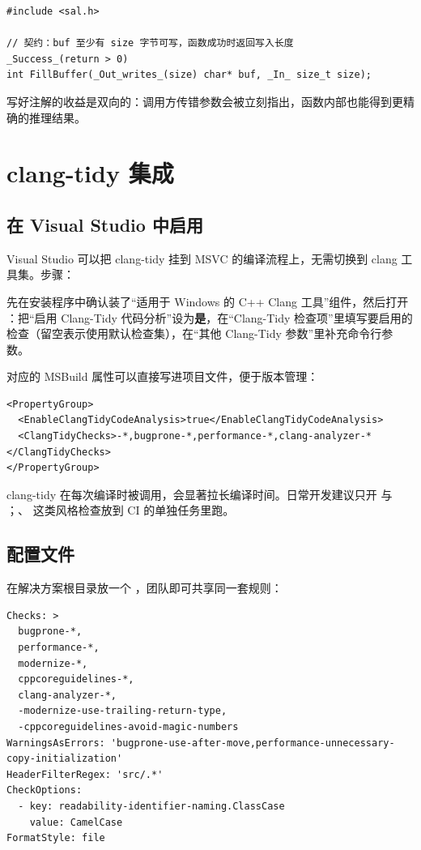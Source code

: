 \begin{lstlisting}[style=cppstyle]
#include <sal.h>

// 契约：buf 至少有 size 字节可写，函数成功时返回写入长度
_Success_(return > 0)
int FillBuffer(_Out_writes_(size) char* buf, _In_ size_t size);
\end{lstlisting}

写好注解的收益是双向的：调用方传错参数会被立刻指出，函数内部也能得到更精确的推理结果。

\section{clang-tidy 集成}
\subsection{在 Visual Studio 中启用}
Visual Studio 可以把 clang-tidy 挂到 MSVC 的编译流程上，无需切换到 clang 工具集。步骤：

先在安装程序中确认装了“适用于 Windows 的 C++ Clang 工具”组件，然后打开 ：把“启用 Clang-Tidy 代码分析”设为\textbf{是}，在“Clang-Tidy 检查项”里填写要启用的检查（留空表示使用默认检查集），在“其他 Clang-Tidy 参数”里补充命令行参数。

对应的 MSBuild 属性可以直接写进项目文件，便于版本管理：

\begin{lstlisting}[style=xmlstyle]
<PropertyGroup>
  <EnableClangTidyCodeAnalysis>true</EnableClangTidyCodeAnalysis>
  <ClangTidyChecks>-*,bugprone-*,performance-*,clang-analyzer-*</ClangTidyChecks>
</PropertyGroup>
\end{lstlisting}

\begin{warnbox}[注意]
clang-tidy 在每次编译时被调用，会显著拉长编译时间。日常开发建议只开  与 ；、 这类风格检查放到 CI 的单独任务里跑。
\end{warnbox}

\subsection{ 配置文件}
在解决方案根目录放一个 ，团队即可共享同一套规则：

\begin{lstlisting}[style=textstyle]
Checks: >
  bugprone-*,
  performance-*,
  modernize-*,
  cppcoreguidelines-*,
  clang-analyzer-*,
  -modernize-use-trailing-return-type,
  -cppcoreguidelines-avoid-magic-numbers
WarningsAsErrors: 'bugprone-use-after-move,performance-unnecessary-copy-initialization'
HeaderFilterRegex: 'src/.*'
CheckOptions:
  - key: readability-identifier-naming.ClassCase
    value: CamelCase
FormatStyle: file
\end{lstlisting}

